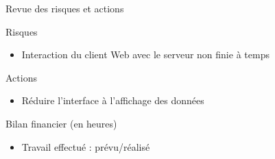 \documentclass{beamer}
\begin{document}
\begin{frame}{Revue des risques et actions}
 \begin{alertblock}{Risques} %
  \begin{itemize}
  \item Interaction du client Web avec le serveur non finie à temps
  \end{itemize}
  \end{alertblock}
 \vspace{10pt}
 \begin{exampleblock}{Actions} %
  \begin{itemize}
  \item Réduire l'interface à l'affichage des données 
  \end{itemize}
  \end{exampleblock}
\end{frame}
\begin{frame}{Bilan financier (en heures)}
  \begin{itemize}
  \item Travail effectué : prévu/réalisé  
  \end{itemize}
\end{frame}


 
\end{document}
